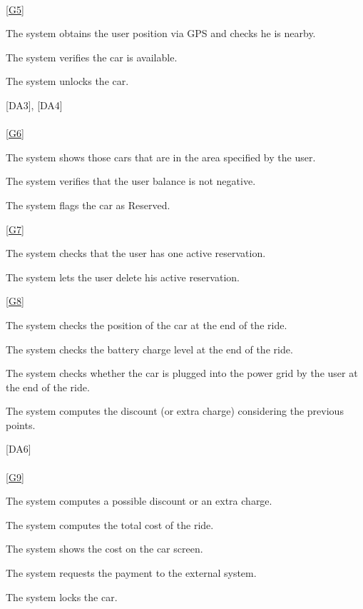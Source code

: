 \documentclass[11pt,a4paper]{report}
\begin{document}
\noindent\\
\ref{G5} \\
\begin{Req}[resume]
\item The system obtains the user position via GPS and checks he is nearby.
\item The system verifies the car is available.
\item The system unlocks the car.
\end{Req}
\hspace{0.4cm}[DA3], [DA4]\\
\noindent\\
\ref{G6} \\
\begin{Req}[resume]
\item The system shows those cars that are in the area specified by the user.
\item The system verifies that the user balance is not negative.
\item The system flags the car as Reserved.
\end{Req}
\noindent\ref{G7} \\
\begin{Req}[resume]
\item The system checks that the user has one active reservation.
\item The system lets the user delete his active reservation.
\end{Req}
\noindent\ref{G8} \\
\begin{Req}[resume]
\item The system checks the position of the car at the end of the ride.
\item The system checks the battery charge level at the end of the ride.
\item The system checks whether the car is plugged into the power grid by the user at the end of the ride.
\item The system computes the discount (or extra charge) considering the previous points.
\end{Req}
\hspace{0.4cm}[DA6]\\
\noindent\\\ref{G9} \\
\begin{Req}[resume]
\item The system computes a possible discount or an extra charge.
\item The system computes the total cost of the ride.
\item The system shows the cost on the car screen.
\item The system requests the payment to the external system.
\item The system locks the car.
\end{Req}
\end{document}
